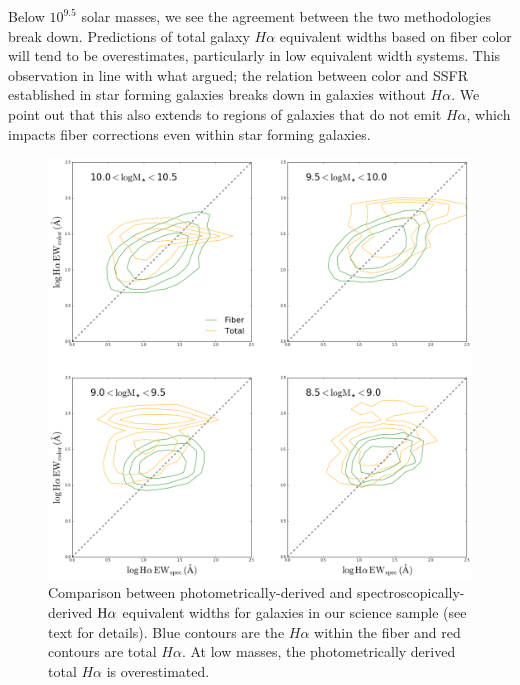 \documentclass[iop]{emulateapj}
\begin{document}
Below $10^{9.5}$ solar masses, we see the agreement between the two methodologies break down. Predictions of total galaxy $H\alpha$ equivalent widths based on fiber color will tend to be overestimates, particularly in low equivalent width systems. This observation  in line with what \cite{Salim07} argued; the relation between color and SSFR established in star forming galaxies breaks down in galaxies without $H\alpha$. We point out that this also extends to regions of galaxies that do not emit $H\alpha$, which impacts fiber corrections even within star forming galaxies.

\begin{figure}
	\centering
	\includegraphics[width= \columnwidth]{HA_EW_compare.png}
	\caption{Comparison between photometrically-derived and spectroscopically-derived $\rm H\alpha$ equivalent widths for galaxies in our science sample (see text for details). Blue contours are the $H\alpha$ within the fiber and red contours are total $H\alpha$. At low masses, the photometrically derived total $H\alpha$ is overestimated.}
     \label{fig:ccheck}

\end{figure}
\end{document}

